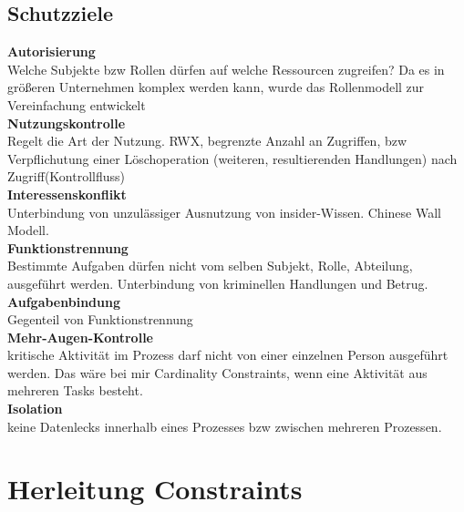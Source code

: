 \subsection{Schutzziele}
\textbf{Autorisierung}\\
Welche Subjekte bzw Rollen dürfen auf welche Ressourcen zugreifen? Da es in größeren Unternehmen komplex werden kann, wurde das Rollenmodell zur Vereinfachung entwickelt\\
\textbf{Nutzungskontrolle}\\
Regelt die Art der Nutzung. RWX, begrenzte Anzahl an Zugriffen, bzw Verpflichutung einer Löschoperation (weiteren, resultierenden Handlungen) nach Zugriff(Kontrollfluss)\\
\textbf{Interessenskonflikt}\\
Unterbindung von unzulässiger Ausnutzung von insider-Wissen. Chinese Wall Modell.\\
\textbf{Funktionstrennung}\\
Bestimmte Aufgaben dürfen nicht vom selben Subjekt, Rolle, Abteilung, ausgeführt werden. Unterbindung von kriminellen Handlungen und Betrug.\\
\textbf{Aufgabenbindung}\\
Gegenteil von Funktionstrennung\\
\textbf{Mehr-Augen-Kontrolle}\\
kritische Aktivität im Prozess darf nicht von einer einzelnen Person ausgeführt werden. Das wäre bei mir Cardinality Constraints, wenn eine Aktivität aus mehreren Tasks besteht.\\
\textbf{Isolation}\\
keine Datenlecks innerhalb eines Prozesses bzw zwischen mehreren Prozessen.\\





\cite{mueller_accorsi}
\section{Herleitung Constraints}




